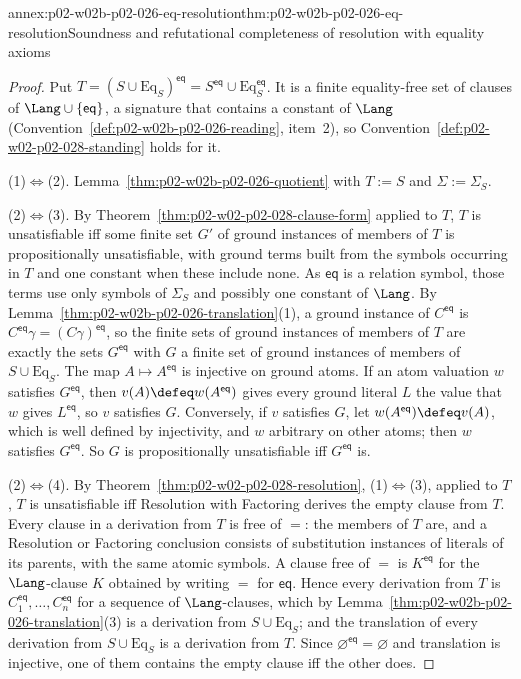 \begin{annexitem}{annex:p02-w02b-p02-026-eq-resolution}{thm:p02-w02b-p02-026-eq-resolution}{Soundness and refutational completeness of resolution with equality axioms}
\begin{proof}
Put \(T=(S\cup\mathrm{Eq}_S)^{\mathsf{eq}}
=S^{\mathsf{eq}}\cup\mathrm{Eq}_S^{\mathsf{eq}}\).  It is a finite
equality-free set of clauses of \(\Lang\cup\{\mathsf{eq}\}\), a signature that
contains a constant of \(\Lang\) (Convention~\ref{def:p02-w02b-p02-026-reading},
item~2), so Convention~\ref{def:p02-w02-p02-028-standing} holds for it.

(1)\(\Leftrightarrow\)(2).  Lemma~\ref{thm:p02-w02b-p02-026-quotient} with
\(T:=S\) and \(\Sigma:=\Sigma_S\).

(2)\(\Leftrightarrow\)(3).  By Theorem~\ref{thm:p02-w02-p02-028-clause-form}
applied to \(T\), \(T\) is unsatisfiable iff some finite set \(G'\) of ground
instances of members of \(T\) is propositionally unsatisfiable, with ground
terms built from the symbols occurring in \(T\) and one constant when these
include none.  As \(\mathsf{eq}\) is a relation symbol, those terms use only
symbols of \(\Sigma_S\) and possibly one constant of \(\Lang\).  By
Lemma~\ref{thm:p02-w02b-p02-026-translation}(1), a ground instance of
\(C^{\mathsf{eq}}\) is \(C^{\mathsf{eq}}\gamma=(C\gamma)^{\mathsf{eq}}\), so
the finite sets of ground instances of members of \(T\) are exactly the sets
\(G^{\mathsf{eq}}\) with \(G\) a finite set of ground instances of members of
\(S\cup\mathrm{Eq}_S\).  The map \(A\mapsto A^{\mathsf{eq}}\) is injective on
ground atoms.  If an atom valuation \(w\) satisfies \(G^{\mathsf{eq}}\), then
\(v(A)\defeq w(A^{\mathsf{eq}})\) gives every ground literal \(L\) the value
that \(w\) gives \(L^{\mathsf{eq}}\), so \(v\) satisfies \(G\).  Conversely, if
\(v\) satisfies \(G\), let \(w(A^{\mathsf{eq}})\defeq v(A)\), which is well
defined by injectivity, and \(w\) arbitrary on other atoms; then \(w\)
satisfies \(G^{\mathsf{eq}}\).  So \(G\) is propositionally unsatisfiable iff
\(G^{\mathsf{eq}}\) is.

(2)\(\Leftrightarrow\)(4).  By Theorem~\ref{thm:p02-w02-p02-028-resolution},
(1)\(\Leftrightarrow\)(3), applied to \(T\), \(T\) is unsatisfiable iff
Resolution with Factoring derives the empty clause from \(T\).  Every clause
in a derivation from \(T\) is free of \(=\): the members of \(T\) are, and a
Resolution or Factoring conclusion consists of substitution instances of
literals of its parents, with the same atomic symbols.  A clause free of
\(=\) is \(K^{\mathsf{eq}}\) for the \(\Lang\)-clause \(K\) obtained by
writing \(=\) for \(\mathsf{eq}\).  Hence every derivation from \(T\) is
\(C_1^{\mathsf{eq}},\ldots,C_n^{\mathsf{eq}}\) for a sequence of
\(\Lang\)-clauses, which by Lemma~\ref{thm:p02-w02b-p02-026-translation}(3)
is a derivation from \(S\cup\mathrm{Eq}_S\); and the translation of every
derivation from \(S\cup\mathrm{Eq}_S\) is a derivation from \(T\).  Since
\(\varnothing^{\mathsf{eq}}=\varnothing\) and translation is injective, one of
them contains the empty clause iff the other does.


\end{proof}
\end{annexitem}
